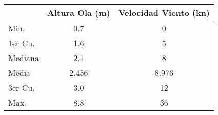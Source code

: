 \begin{tabular}{lS[table-format=1.3]S[table-format=2.3]}
    \toprule
    & {Altura Ola (\si{\meter})} & {Velocidad Viento (\si{\knot})} \\
    \midrule
 Min.    &0.7   &  0   \\ 
 1er Cu. &1.6   &  5   \\ 
 Mediana &2.1   &  8   \\ 
 Media   &2.456   &  8.976   \\ 
 3er Cu. &3.0   & 12   \\ 
 Max.    &8.8   & 36   \\ 
    \bottomrule
\end{tabular}

